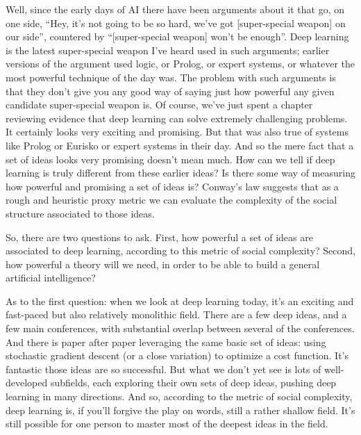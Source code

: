 Well, since the early days of AI there have been arguments about it that go, on one side, ``Hey, it's not going to be so hard, we've got [super-special weapon] on our side'', countered by ``[super-special weapon] won't be enough''. Deep learning is the latest super-special weapon I've heard used in such arguments; earlier versions of the argument used logic, or Prolog, or expert systems, or whatever the most powerful technique of the day was. The problem with such arguments is that they don't give you any good way of saying just how powerful any given candidate super-special weapon is. Of course, we've just spent a chapter reviewing evidence that deep learning can solve extremely challenging problems. It certainly looks very exciting and promising. But that was also true of systems like Prolog or Eurisko \cite{WikipeadiaEurisko2019} or expert systems in their day. And so the mere fact that a set of ideas looks very promising doesn't mean much. How can we tell if deep learning is truly different from these earlier ideas? Is there some way of measuring how powerful and promising a set of ideas is? Conway's law suggests that as a rough and heuristic proxy metric we can evaluate the complexity of the social structure associated to those ideas.

So, there are two questions to ask. First, how powerful a set of ideas are associated to deep learning, according to this metric of social complexity? Second, how powerful a theory will we need, in order to be able to build a general artificial intelligence?

As to the first question: when we look at deep learning today, it's an exciting and fast-paced but also relatively monolithic field. There are a few deep ideas, and a few main conferences, with substantial overlap between several of the conferences. And there is paper after paper leveraging the same basic set of ideas: using stochastic gradient descent (or a close variation) to optimize a cost function. It's fantastic those ideas are so successful. But what we don't yet see is lots of well-developed subfields, each exploring their own sets of deep ideas, pushing deep learning in many directions. And so, according to the metric of social complexity, deep learning is, if you'll forgive the play on words, still a rather shallow field. It's still possible for one person to master most of the deepest ideas in the field.

